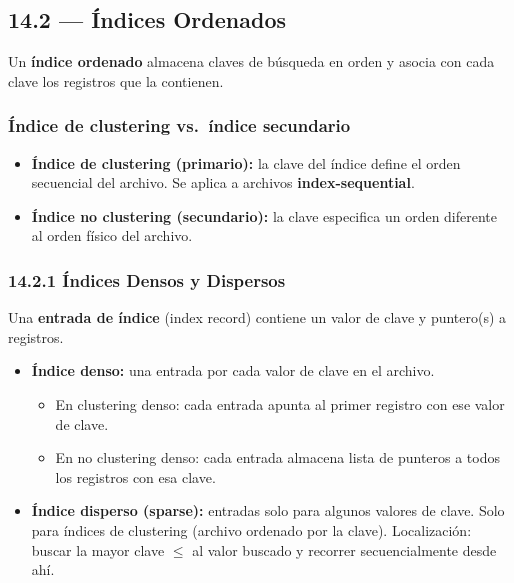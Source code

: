 \documentclass[11pt, a4paper]{article}
\begin{document}
\subsection{14.2 --- Índices Ordenados}

Un \textbf{índice ordenado} almacena claves de búsqueda en orden y asocia con cada clave los registros que la contienen.

\subsubsection{Índice de clustering vs.\ índice secundario}

\begin{itemize}[nosep]
	\item \textbf{Índice de clustering (primario):} la clave del índice define el orden secuencial del archivo. Se aplica a archivos \textbf{index-sequential}.
	\item \textbf{Índice no clustering (secundario):} la clave especifica un orden diferente al orden físico del archivo.
\end{itemize}

\subsubsection{14.2.1 Índices Densos y Dispersos}

Una \textbf{entrada de índice} (index record) contiene un valor de clave y puntero(s) a registros.

\begin{itemize}[nosep]
	\item \textbf{Índice denso:} una entrada por cada valor de clave en el archivo.
	      \begin{itemize}[nosep]
		      \item En clustering denso: cada entrada apunta al primer registro con ese valor de clave.
		      \item En no clustering denso: cada entrada almacena lista de punteros a todos los registros con esa clave.
	      \end{itemize}
	\item \textbf{Índice disperso (sparse):} entradas solo para algunos valores de clave. Solo para índices de clustering (archivo ordenado por la clave). Localización: buscar la mayor clave $\leq$ al valor buscado y recorrer secuencialmente desde ahí.
\end{itemize}
\end{document}
